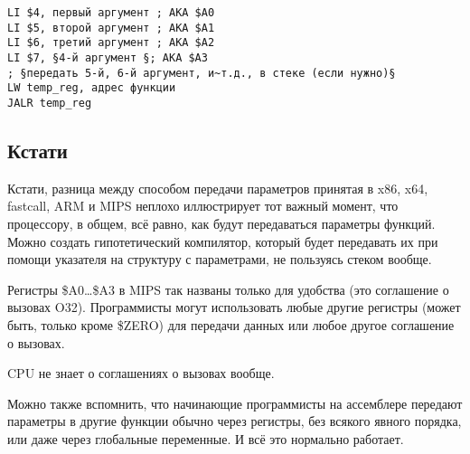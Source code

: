 \begin{lstlisting}[caption=MIPS (соглашение о вызовах O32)]
LI $4, первый аргумент ; AKA $A0
LI $5, второй аргумент ; AKA $A1
LI $6, третий аргумент ; AKA $A2
LI $7, §4-й аргумент §; AKA $A3
; §передать 5-й, 6-й аргумент, и~т.д., в стеке (если нужно)§
LW temp_reg, адрес функции
JALR temp_reg
\end{lstlisting}

\subsection{Кстати}

Кстати, разница между способом передачи параметров принятая в x86, x64, fastcall, ARM и MIPS неплохо иллюстрирует тот важный момент, что процессору, в общем, всё равно, как будут 
передаваться параметры функций. Можно создать гипотетический компилятор, который будет передавать их при 
помощи указателя на структуру с параметрами, не пользуясь стеком вообще.

Регистры \$A0\dots \$A3 в MIPS так названы только для удобства (это соглашение о вызовах O32).
Программисты могут использовать любые другие регистры (может быть, только кроме \$ZERO) для
передачи данных или любое другое соглашение о вызовах.

\ac{CPU} не знает о соглашениях о вызовах вообще.

Можно также вспомнить, что начинающие программисты на ассемблере передают параметры 
в другие функции обычно через регистры, без всякого явного порядка, или даже через глобальные переменные.
И всё это нормально работает.

